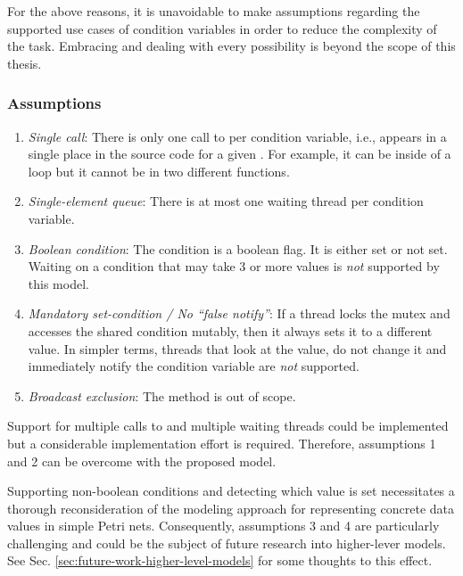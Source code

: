 For the above reasons, it is unavoidable to make assumptions
regarding the supported use cases of condition variables
in order to reduce the complexity of the task.
Embracing and dealing with every possibility is beyond the scope of this thesis.

\subsubsection{Assumptions}

\begin{enumerate}
      \item \emph{Single call}: There is only one call to  per condition variable, i.e.,
             appears in a single place in the source code for a given .
            For example, it can be inside of a loop but it cannot be in two different functions.
      \item \emph{Single-element queue}: There is at most one waiting thread per condition variable.
      \item \emph{Boolean condition}: The condition is a boolean flag. It is either set or not set.
            Waiting on a condition that may take 3 or more values is \emph{not} supported by this model.
      \item \emph{Mandatory set-condition / No ``false notify''}: If a thread locks the mutex and accesses the shared condition mutably,
            then it always sets it to a different value.
            In simpler terms, threads that look at the value, do not change it
            and immediately notify the condition variable are \emph{not} supported.
      \item \emph{Broadcast exclusion}: The method  is out of scope.
\end{enumerate}

Support for multiple calls to  and multiple waiting threads could be implemented
but a considerable implementation effort is required.
Therefore, assumptions 1 and 2 can be overcome with the proposed model.

Supporting non-boolean conditions
and detecting which value is set
necessitates a thorough reconsideration of the modeling approach
for representing concrete data values in simple Petri nets.
Consequently, assumptions 3 and 4 are particularly challenging and
could be the subject of future research into higher-lever models.
See Sec. \ref{sec:future-work-higher-level-models} for some thoughts to this effect.


